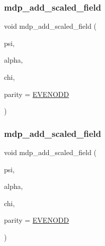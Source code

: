 \mbox{\label{classmdp__complex__field_adebe165924543c988d0c7e86da4b2eb3}} 
\subsubsection{\texorpdfstring{mdp\+\_\+add\+\_\+scaled\+\_\+field}{mdp\_add\_scaled\_field}\hspace{0.1cm}{\footnotesize\ttfamily [1/2]}}
{\footnotesize\ttfamily void mdp\+\_\+add\+\_\+scaled\+\_\+field (\begin{DoxyParamCaption}\item[{\hyperlink{classmdp__complex__field}{mdp\+\_\+complex\+\_\+field} \&}]{psi,  }\item[{\hyperlink{mdp__global__vars_8h_a69d96b74c791e0bbdb888b3913a69450}{mdp\+\_\+real}}]{alpha,  }\item[{\hyperlink{classmdp__complex__field}{mdp\+\_\+complex\+\_\+field} \&}]{chi,  }\item[{int}]{parity = {\ttfamily \hyperlink{mdp__global__vars_8h_a4c9de81f2de5a74b588107b6c0afb9ee}{E\+V\+E\+N\+O\+DD}} }\end{DoxyParamCaption})\hspace{0.3cm}{\ttfamily [friend]}}

\mbox{\label{classmdp__complex__field_aeb331a3604fa5d1e30e726958e2cc21f}} 
\subsubsection{\texorpdfstring{mdp\+\_\+add\+\_\+scaled\+\_\+field}{mdp\_add\_scaled\_field}\hspace{0.1cm}{\footnotesize\ttfamily [2/2]}}
{\footnotesize\ttfamily void mdp\+\_\+add\+\_\+scaled\+\_\+field (\begin{DoxyParamCaption}\item[{\hyperlink{classmdp__complex__field}{mdp\+\_\+complex\+\_\+field} \&}]{psi,  }\item[{\hyperlink{classmdp__complex}{mdp\+\_\+complex}}]{alpha,  }\item[{\hyperlink{classmdp__complex__field}{mdp\+\_\+complex\+\_\+field} \&}]{chi,  }\item[{int}]{parity = {\ttfamily \hyperlink{mdp__global__vars_8h_a4c9de81f2de5a74b588107b6c0afb9ee}{E\+V\+E\+N\+O\+DD}} }\end{DoxyParamCaption})\hspace{0.3cm}{\ttfamily [friend]}}

